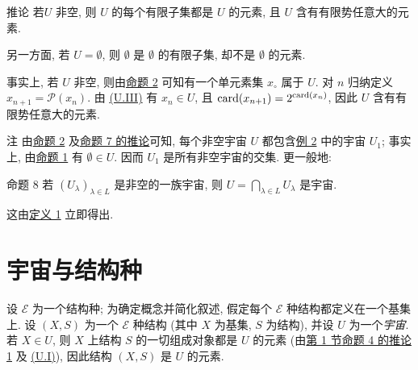 \hypertarget{sga4.exp.I.appendix.II.sec.1.corollary.to.proposition.7}{}
\begin{enonce*}{推论}
若\pageoriginale $U$ 非空, 则 $U$ 的每个有限子集都是 $U$ 的元素, 且 $U$ 含有有限势任意大的元素.
\end{enonce*}
另一方面, 若 $U=∅$, 则 $∅$ 是 $∅$ 的有限子集, 却不是 $∅$ 的元素.

事实上, 若 $U$ 非空, 则由\hyperlink{sga4.exp.I.appendix.II.sec.1.proposition.2}{命题 2} 可知有一个单元素集 $x_{\circ}$ 属于 $U$. 对 $n$ 归纳定义 $x_{n+1}=\mathcal{P}(x_n)$. 由 \hyperlink{sga4.exp.I.appendix.II.sec.1.definition.1.condition.U.III}{(U.III)} 有 $x_n\in U$, 且 $\operatorname{card}(x_{n+1})=2^{\operatorname{card}(x_n)}$, 因此 $U$ 含有有限势任意大的元素.

\begin{enonce*}[remark]{注}
由\hyperlink{sga4.exp.I.appendix.II.sec.1.proposition.2}{命题 2} 及\hyperlink{sga4.exp.I.appendix.II.sec.1.corollary.to.proposition.7}{命题 7 的推论}可知, 每个非空宇宙 $U$ 都包含\hyperlink{sga4.exp.I.appendix.II.sec.1.example.2}{例 2} 中的宇宙 $U_1$; 事实上, 由\hyperlink{sga4.exp.I.appendix.II.sec.1.proposition.1}{命题 1} 有 $∅\in U$. 因而 $U_1$ 是所有非空宇宙的交集. 更一般地:
\end{enonce*}

\hypertarget{sga4.exp.I.appendix.II.sec.1.proposition.8}{}
\begin{enonce*}{命题 8}
若 $(U_{\lambda})_{\lambda\in L}$ 是非空的一族宇宙, 则 $U=\bigcap_{\lambda\in L}U_{\lambda}$ 是宇宙.
\end{enonce*}
这由\hyperlink{sga4.exp.I.appendix.II.sec.1.definition.1}{定义 1} 立即得出.



\section{宇宙与结构种}%
\hypertarget{sga4.exp.I.appendix.II.sec.2}{}

设 $\mathcal{E}$ 为一个结构种; 为确定概念并简化叙述, 假定每个 $\mathcal{E}$ 种结构都定义在一个基集上. 设 $(X,S)$ 为一个 $\mathcal{E}$ 种结构 (其中 $X$ 为基集, $S$ 为结构), 并设 $U$ 为一个\emph{宇宙}. 若 $X\in U$, 则 $X$ 上结构 $S$ 的一切组成对象都是 $U$ 的元素 (由\hyperlink{sga4.exp.I.appendix.II.sec.1}{第 1 节}\hyperlink{sga4.exp.I.appendix.II.sec.1.corollary.to.proposition.4.1}{命题 4 的推论 1} 及 \hyperlink{sga4.exp.I.appendix.II.sec.1.definition.1.condition.U.I}{(U.I)}), 因此结构 $(X,S)$ 是 $U$ 的元素.

